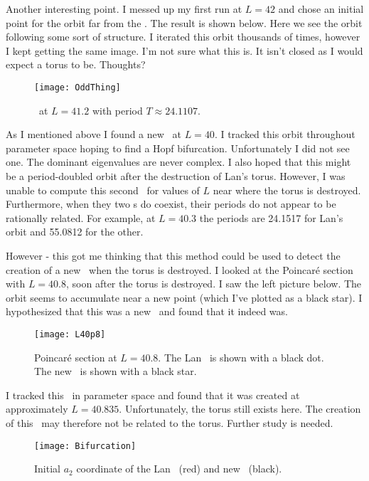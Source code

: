 \begin{description}
{Another interesting point.  I messed up my first run at $L=42$ and chose an initial point for the orbit far from the \po.  The result is shown below.  Here we see the orbit following some sort of structure.  I iterated this orbit thousands of times, however I kept getting the same image.  I'm not sure what this is.  It isn't closed as I would expect a torus to be.  Thoughts?

 \begin{figure}[!h]
\centering
\texttt{[image: OddThing]}
  \caption{
   \Po\ at $L=41.2$ with period $T \approx24.1107$.
   }
  \label{fig:WeirdThing}
 \end{figure}

As I mentioned above I found a new \po\ at $L=40$.  I tracked this orbit throughout parameter space hoping to find a Hopf bifurcation.  Unfortunately I did not see one.  The dominant eigenvalues are never complex.  I also hoped that this might be a period-doubled orbit after the destruction of Lan's torus.  However, I was unable to compute this second \po\ for values of $L$ near where the torus is destroyed.  Furthermore, when they two \po s do coexist, their periods do not appear to be rationally related.  For example, at $L=40.3$ the periods are 24.1517 for Lan's orbit and 55.0812 for the other.

However - this got me thinking that this method could be used to detect the creation of a new \po\ when the torus is destroyed.  I looked at the Poincar\'e section with $L=40.8$, soon after the torus is destroyed.  I saw the left picture below.  The orbit seems to accumulate near a new point (which I've plotted as a black star).  I hypothesized that this was a new \po\ and found that it indeed was.

\begin{figure}[!h]
\centering
\texttt{[image: L40p8]}
  \caption{
   Poincar\'e section at $L=40.8$.  The Lan \po\ is shown with a black dot.  The new \po\ is shown with a black star.
   }
  \label{fig:L40p8}
 \end{figure}

I tracked this \po\ in parameter space and found that it was created at approximately $L=40.835$.   Unfortunately, the torus still exists here.  The creation of this \po\ may therefore not be related to the torus.  Further study is needed.

 \begin{figure}[!h]
\centering
\texttt{[image: Bifurcation]}
  \caption{
   Initial $a_2$ coordinate of the Lan \po\ (red) and new \po\ (black).
   }
  \label{fig:Bifurcation}
 \end{figure}
 }


\end{description}
